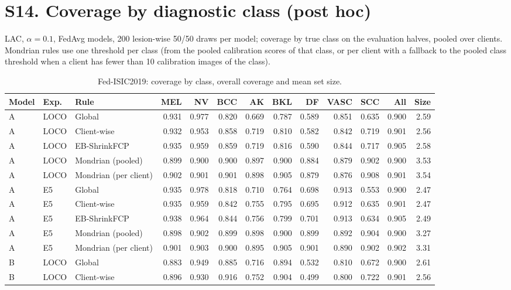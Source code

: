 \documentclass[10pt]{article}
\begin{document}
\section*{S14. Coverage by diagnostic class (post hoc)}
LAC, $\alpha=0.1$, FedAvg models, 200 lesion-wise 50/50 draws per model; coverage by true class on the evaluation halves, pooled over clients. Mondrian rules use one threshold per class (from the pooled calibration scores of that class, or per client with a fallback to the pooled class threshold when a client has fewer than 10 calibration images of the class).
\begin{table}[!htbp]
\centering
\scriptsize
\caption{Fed-ISIC2019: coverage by class, overall coverage and mean set size.}
\label{tab:s14}
\begin{tabular}{@{}lllrrrrrrrrrr@{}}
\toprule
Model & Exp. & Rule & MEL & NV & BCC & AK & BKL & DF & VASC & SCC & All & Size \\
\midrule
A & LOCO & Global & 0.931 & 0.977 & 0.820 & 0.669 & 0.787 & 0.589 & 0.851 & 0.635 & 0.900 & 2.59 \\
A & LOCO & Client-wise & 0.932 & 0.953 & 0.858 & 0.719 & 0.810 & 0.582 & 0.842 & 0.719 & 0.901 & 2.56 \\
A & LOCO & EB-ShrinkFCP & 0.935 & 0.959 & 0.859 & 0.719 & 0.816 & 0.590 & 0.844 & 0.717 & 0.905 & 2.58 \\
A & LOCO & Mondrian (pooled) & 0.899 & 0.900 & 0.900 & 0.897 & 0.900 & 0.884 & 0.879 & 0.902 & 0.900 & 3.53 \\
A & LOCO & Mondrian (per client) & 0.902 & 0.901 & 0.901 & 0.898 & 0.905 & 0.879 & 0.876 & 0.908 & 0.901 & 3.54 \\
\midrule
A & E5 & Global & 0.935 & 0.978 & 0.818 & 0.710 & 0.764 & 0.698 & 0.913 & 0.553 & 0.900 & 2.47 \\
A & E5 & Client-wise & 0.935 & 0.959 & 0.842 & 0.755 & 0.795 & 0.695 & 0.912 & 0.635 & 0.901 & 2.47 \\
A & E5 & EB-ShrinkFCP & 0.938 & 0.964 & 0.844 & 0.756 & 0.799 & 0.701 & 0.913 & 0.634 & 0.905 & 2.49 \\
A & E5 & Mondrian (pooled) & 0.898 & 0.902 & 0.899 & 0.898 & 0.900 & 0.899 & 0.892 & 0.904 & 0.900 & 3.27 \\
A & E5 & Mondrian (per client) & 0.901 & 0.903 & 0.900 & 0.895 & 0.905 & 0.901 & 0.890 & 0.902 & 0.902 & 3.31 \\
\midrule
B & LOCO & Global & 0.883 & 0.949 & 0.885 & 0.716 & 0.894 & 0.532 & 0.810 & 0.672 & 0.900 & 2.61 \\
B & LOCO & Client-wise & 0.896 & 0.930 & 0.916 & 0.752 & 0.904 & 0.499 & 0.800 & 0.722 & 0.901 & 2.56 \\

\end{tabular}
\end{table}
\end{document}
